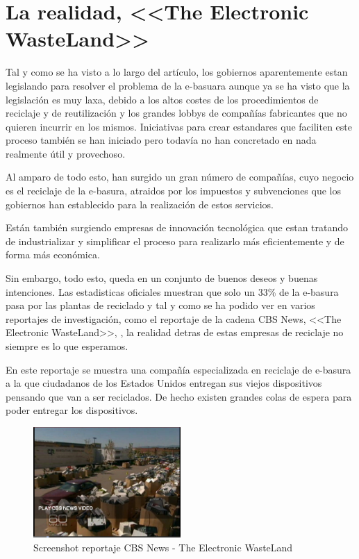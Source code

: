 \section{La realidad, <<The Electronic WasteLand>>}

Tal y como se ha visto a lo largo del artículo, los gobiernos aparentemente estan legislando para resolver el problema de la e-basuara aunque ya se ha visto que la legislación es muy laxa, debido a los altos costes de los procedimientos de reciclaje y de reutilización y los grandes lobbys de compañías fabricantes que no quieren incurrir en los mismos. Iniciativas para crear estandares que faciliten este proceso también se han iniciado pero todavía no han concretado en nada realmente útil y provechoso.

Al amparo de todo esto, han surgido un gran número de compañías, cuyo negocio es el reciclaje de la e-basura, atraidos por los impuestos y subvenciones que los gobiernos han establecido para la realización de estos servicios. 

Están también surgiendo empresas de innovación tecnológica que estan tratando de industrializar y simplificar el proceso para realizarlo más eficientemente y de forma más económica.

Sin embargo, todo esto, queda en un conjunto de buenos deseos y buenas intenciones. Las estadisticas oficiales muestran que solo un 33\% de la e-basura pasa por las plantas de reciclado y tal y como se ha podido ver en varios reportajes de investigación, como el reportaje de la cadena CBS News, <<The Electronic WasteLand>>, \cite{wasteland}, la realidad detras de estas empresas de reciclaje no siempre es lo que esperamos.

En este reportaje se muestra una compañía especializada en reciclaje de e-basura a la que ciudadanos de los Estados Unidos entregan sus viejos dispositivos pensando que van a ser reciclados. De hecho existen grandes colas de espera para poder entregar los dispositivos.

\begin{figure}[H]
\begin{center}
\includegraphics[width=0.5\textwidth]{img/screen1}
\caption{Screenshot reportaje CBS News - The Electronic WasteLand}
\end{center}
\end{figure}